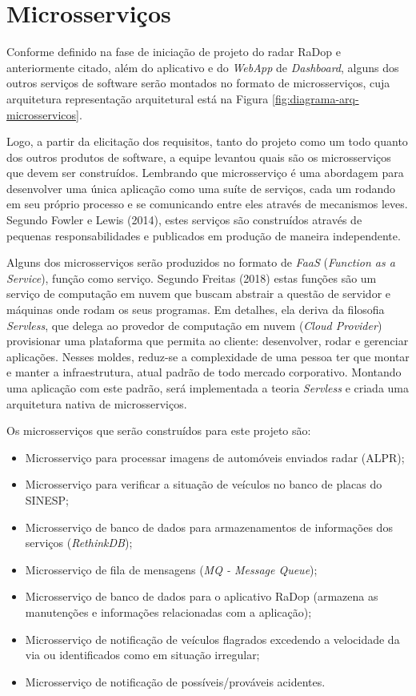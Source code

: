 \section{Microsserviços}

Conforme definido na fase de iniciação de projeto do radar RaDop e anteriormente citado, além do aplicativo e do \textit{WebApp} de \textit{Dashboard}, alguns dos outros serviços de software serão montados no formato de microsserviços, cuja arquitetura representação arquitetural está na Figura \ref{fig:diagrama-arq-microsservicos}.

Logo, a partir da elicitação dos requisitos, tanto do projeto como um todo quanto dos outros produtos de software, a equipe levantou quais são os microsserviços que devem ser construídos. Lembrando que microsserviço é uma abordagem para desenvolver uma única aplicação como uma suíte de serviços, cada um rodando em seu próprio processo e se comunicando entre eles através de mecanismos leves. Segundo Fowler e Lewis (2014), estes serviços são construídos através de pequenas responsabilidades e publicados em produção de maneira independente.

Alguns dos microsserviços serão produzidos no formato de \textit{FaaS} (\textit{Function as a Service}), função como serviço. Segundo Freitas (2018) estas funções são um serviço de computação em nuvem que buscam abstrair a questão de servidor e máquinas onde rodam os seus programas. Em detalhes, ela deriva da filosofia \textit{Servless}, que delega ao provedor de computação em nuvem (\textit{Cloud Provider}) provisionar uma plataforma que permita ao cliente: desenvolver, rodar e gerenciar aplicações. Nesses moldes, reduz-se a complexidade de uma pessoa ter que montar e manter a infraestrutura, atual padrão de todo mercado corporativo. Montando uma aplicação com este padrão, será implementada a teoria \textit{Servless} e criada uma arquitetura nativa de microsserviços.

Os microsserviços que serão construídos para este projeto são:

\begin{itemize}
    \item Microsserviço para processar imagens de automóveis enviados radar (ALPR);
    \item Microsserviço para verificar a situação de veículos no banco de placas do SINESP;
    \item Microsserviço de banco de dados para armazenamentos de informações dos serviços (\textit{RethinkDB});
    \item Microsserviço de fila de mensagens (\textit{MQ - Message Queue});
    \item Microsserviço de banco de dados para o aplicativo RaDop (armazena as manutenções e informações relacionadas com a aplicação);
    \item Microsserviço de notificação de veículos flagrados excedendo a velocidade da via ou identificados como em situação irregular;
    \item Microsserviço de notificação de possíveis/prováveis acidentes.
\end{itemize}

